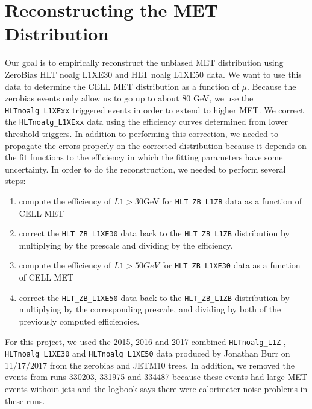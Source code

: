 \section{Reconstructing the MET Distribution}
Our goal is to empirically reconstruct the unbiased MET distribution using ZeroBias HLT noalg L1XE30 and HLT noalg L1XE50 data. 
We want to use this data to determine the CELL MET distribution as a function of $\mu$.
Because the zerobias events only allow us to go up to about $80$ GeV, we use the \texttt{HLTnoalg\_L1XExx} triggered events in order to extend to higher MET.
We correct the \texttt{HLTnoalg\_L1XExx} data using the efficiency curves determined from lower threshold triggers.
In addition to performing this correction, we needed to propagate the errors properly on the corrected distribution because it depends on the fit functions to the efficiency in which the fitting parameters have some uncertainty. 
In order to do the reconstruction, we needed to perform several steps:
\begin{enumerate}
        \item compute the efficiency of $L1>30$GeV for \texttt{HLT\_ZB\_L1ZB} data as a function of CELL MET
        \item correct the \texttt{HLT\_ZB\_L1XE30} data back to the \texttt{HLT\_ZB\_L1ZB} distribution by multiplying by the prescale and dividing by the efficiency. 
        \item compute the efficiency of $L1>50GeV$ for \texttt{HLT\_ZB\_L1XE30} data as a function of CELL MET
        \item correct the \texttt{HLT\_ZB\_L1XE50} data back to the \texttt{HLT\_ZB\_L1ZB} distribution by multiplying by the corresponding prescale, and dividing by both of the previously computed efficiencies. 
\end{enumerate}
For this project, we used the 2015, 2016 and 2017 combined \texttt{HLTnoalg\_L1Z} , \texttt{HLTnoalg\_L1XE30} and \texttt{HLTnoalg\_L1XE50} data produced by Jonathan Burr on 11/17/2017 from the zerobias and JETM10 trees.
In addition, we removed the events from runs 330203, 331975 and 334487 because these events had large MET events without jets and the logbook says there were calorimeter noise problems in these runs. 
